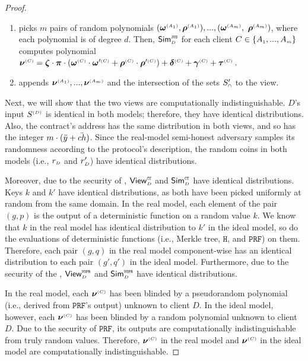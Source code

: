 \begin{proof}
\begin{enumerate}
\item picks $m$ pairs of random polynomials $( {\bm\omega}^{\scriptscriptstyle (A_1)},  {\bm\rho}^{\scriptscriptstyle (A_1)}),..., ( {\bm\omega}^{\scriptscriptstyle (A_m)},$ $  {\bm\rho}^{\scriptscriptstyle (A_m)})$, where each polynomial is of degree $d$. Then, $\mathsf{Sim}^{\scriptscriptstyle \mathtt{JUS}}_{\scriptscriptstyle D}$ for each client $C\in  \{  {  A}_{ \scriptscriptstyle {   1}}, ...,   {  A}_{ \scriptscriptstyle {   m}}\} $ computes polynomial $ {\bm\nu}^{\scriptscriptstyle (C)}= {\bm\zeta}\cdot {\bm\pi}\cdot(  {\bm\omega}^{\scriptscriptstyle (C)}\cdot  {\bm\omega}'^{\scriptscriptstyle (C)}+  {\bm\rho}^{\scriptscriptstyle (C)}\cdot  {\bm\rho}'^{\scriptscriptstyle (C)})+ {\bm\delta}^{\scriptscriptstyle (C)}+ {\bm\gamma}^{\scriptscriptstyle(C)}+  {\bm\tau}^{ \scriptscriptstyle {  {(C)}}}$. 
%
\item appends $ {\bm\nu}^{\scriptscriptstyle (A_1)},...,  {\bm\nu}^{\scriptscriptstyle (A_m)}$ and the intersection of the sets $S'_{\scriptscriptstyle \cap}$ to the view. 
%
\end{enumerate}

  \vspace{-2mm}

 Next, we will show that the two views are computationally indistinguishable. $D$'s input $S^{\scriptscriptstyle (D)}$ is
 identical in both models; therefore, they have identical distributions. Also, the contract's address has the same distribution in both views, and so has the integer $ m\cdot(\ddot{y}+\ddot{ch})$. Since the real-model semi-honest adversary samples its randomness according to the protocol’s description, the random coins in both models (i.e., $r_{\scriptscriptstyle D}$  and $r'_{\scriptscriptstyle D}$) have identical distributions. 
 
 Moreover, due to the security of  \ct, $\mathsf{View}^{\scriptscriptstyle \mathtt{CT}}_{\scriptscriptstyle D}$ and $\mathsf{Sim}^{\scriptscriptstyle \mathtt{CT}}_{\scriptscriptstyle D}$ have identical distributions. Keys $k$ and $  k'$ have identical distributions, as both have been picked uniformly at random from the same domain.  In the real model, each element of the pair $(g, p)$ is the output of a deterministic function on a random value $k$. We know that $k$ in the real model has identical distribution to $  k'$ in the ideal model, so do the evaluations of deterministic functions (i.e., Merkle tree, $\mathtt{H}$, and $\mathtt {PRF}$) on them. Therefore, each pair $(g, q)$ in the real model component-wise has an identical distribution to each pair $(g', q')$ in the ideal model.  
 Furthermore, due to the security of the \vopr, $\mathsf{View}^{\scriptscriptstyle \mathtt{VOPR}}_{\scriptscriptstyle D}$ and $\mathsf{Sim}^{\scriptscriptstyle \mathtt{VOPR}}_{\scriptscriptstyle D}$ have identical distributions.
 
 
 In the real model, each $\bm\nu^{\scriptscriptstyle (C)}$ has been blinded by a pseudorandom polynomial (i.e., derived from $\mathtt{PRF}$'s output) unknown to client $D$. In the ideal model, however, each $ {\bm\nu}^{\scriptscriptstyle (C)}$ has been blinded by a random polynomial unknown to client $D$. Due to the security of $\mathtt{PRF}$,  its outputs are computationally indistinguishable from truly random values.  Therefore, ${\bm\nu}^{\scriptscriptstyle (C)}$ in the real model and $ {\bm\nu}^{\scriptscriptstyle (C)}$ in the ideal model are computationally indistinguishable. 
 

\end{proof}
